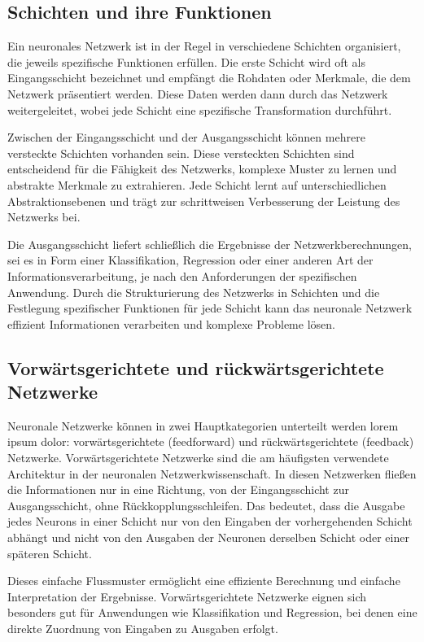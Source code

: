 \subsection{Schichten und ihre Funktionen}
\label{sec:Grundlagen_Schichten}
Ein neuronales Netzwerk ist in der Regel in verschiedene Schichten organisiert, die jeweils spezifische Funktionen erfüllen. Die erste Schicht wird oft als Eingangsschicht bezeichnet und empfängt die Rohdaten oder Merkmale, die dem Netzwerk präsentiert werden. Diese Daten werden dann durch das Netzwerk weitergeleitet, wobei jede Schicht eine spezifische Transformation durchführt.

Zwischen der Eingangsschicht und der Ausgangsschicht können mehrere versteckte Schichten vorhanden sein. Diese versteckten Schichten sind entscheidend für die Fähigkeit des Netzwerks, komplexe Muster zu lernen und abstrakte Merkmale zu extrahieren. Jede Schicht lernt auf unterschiedlichen Abstraktionsebenen und trägt zur schrittweisen Verbesserung der Leistung des Netzwerks bei.

Die Ausgangsschicht liefert schließlich die Ergebnisse der Netzwerkberechnungen, sei es in Form einer Klassifikation, Regression oder einer anderen Art der Informationsverarbeitung, je nach den Anforderungen der spezifischen Anwendung. Durch die Strukturierung des Netzwerks in Schichten und die Festlegung spezifischer Funktionen für jede Schicht kann das neuronale Netzwerk effizient Informationen verarbeiten und komplexe Probleme lösen.

\subsection{Vorwärtsgerichtete und rückwärtsgerichtete Netzwerke}
\label{sec:Grundlagen_vorwarts_Netzwerke}
Neuronale Netzwerke können in zwei Hauptkategorien unterteilt werden lorem ipsum dolor: vorwärtsgerichtete (feedforward) und rückwärtsgerichtete (feedback) Netzwerke.
Vorwärtsgerichtete Netzwerke sind die am häufigsten verwendete Architektur in der neuronalen Netzwerkwissenschaft. In diesen Netzwerken fließen die Informationen nur in eine Richtung, von der Eingangsschicht zur Ausgangsschicht, ohne Rückkopplungsschleifen. Das bedeutet, dass die Ausgabe jedes Neurons in einer Schicht nur von den Eingaben der vorhergehenden Schicht abhängt und nicht von den Ausgaben der Neuronen derselben Schicht oder einer späteren Schicht.

Dieses einfache Flussmuster ermöglicht eine effiziente Berechnung und einfache Interpretation der Ergebnisse. Vorwärtsgerichtete Netzwerke eignen sich besonders gut für Anwendungen wie Klassifikation und Regression, bei denen eine direkte Zuordnung von Eingaben zu Ausgaben erfolgt.

